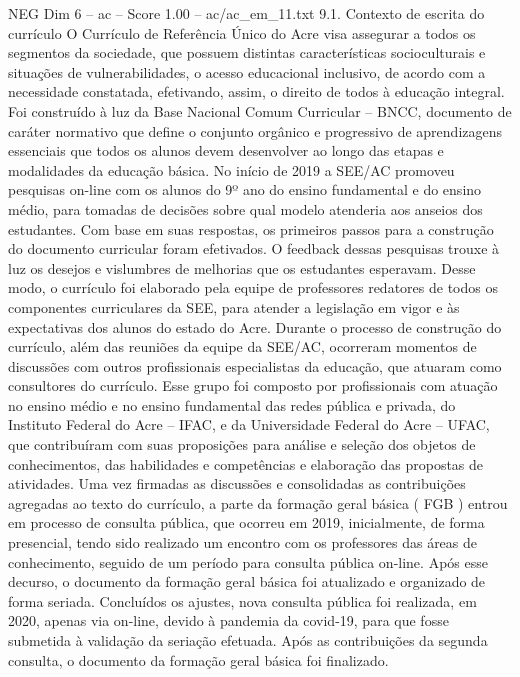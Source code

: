 \begin{textsample}{NEG Dim 6 – ac – Score 1.00 – ac/ac\_em\_11.txt}  \label{ex:f6_neg_136}
9.1.
Contexto de escrita do currículo O Currículo de Referência Único do Acre visa assegurar a todos os segmentos da sociedade, que possuem distintas características socioculturais e situações de vulnerabilidades, o acesso educacional inclusivo, de acordo com a necessidade constatada, efetivando, assim, o direito de todos à educação integral.
Foi construído à luz da Base Nacional Comum Curricular – BNCC, documento de caráter normativo que define o conjunto orgânico e progressivo de aprendizagens essenciais que todos os alunos devem desenvolver ao longo das etapas e modalidades da educação básica.
No início de 2019 a SEE/AC promoveu pesquisas on-line com os alunos do 9º ano do ensino fundamental e do ensino médio, para tomadas de decisões sobre qual modelo atenderia aos anseios dos estudantes.
Com base em suas respostas, os primeiros passos para a construção do documento curricular foram efetivados.
O feedback dessas pesquisas trouxe à luz os desejos e vislumbres de melhorias que os estudantes esperavam.
Desse modo, o currículo foi elaborado pela equipe de professores redatores de todos os componentes curriculares da SEE, para atender a legislação em vigor e às expectativas dos alunos do estado do Acre.
Durante o processo de construção do currículo, além das reuniões da equipe da SEE/AC, ocorreram momentos de discussões com outros profissionais especialistas da educação, que atuaram como consultores do currículo.
Esse grupo foi composto por profissionais com atuação no ensino médio e no ensino fundamental das redes pública e privada, do Instituto Federal do Acre – IFAC, e da Universidade Federal do Acre – UFAC, que contribuíram com suas proposições para análise e seleção dos objetos de conhecimentos, das habilidades e competências e elaboração das propostas de atividades.
Uma vez firmadas as discussões e consolidadas as contribuições agregadas ao texto do currículo, a parte da formação geral básica ( FGB ) entrou em processo de consulta pública, que ocorreu em 2019, inicialmente, de forma presencial, tendo sido realizado um encontro com os professores das áreas de conhecimento, seguido de um período para consulta pública on-line.
Após esse decurso, o documento da formação geral básica foi atualizado e organizado de forma seriada.
Concluídos os ajustes, nova consulta pública foi realizada, em 2020, apenas via on-line, devido à pandemia da covid-19, para que fosse submetida à validação da seriação efetuada.
Após as contribuições da segunda consulta, o documento da formação geral básica foi finalizado.

\end{textsample}
